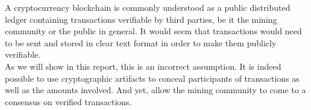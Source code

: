 

A cryptocurrency blockchain is commonly understood as a public distributed ledger containing transactions 
verifiable by third parties, be it the mining community or the public in general.
It would seem that transactions would need to be sent and stored in clear text format in order to
make them publicly verifiable.
\\

As we will show in this report, this is an incorrect assumption. It is indeed possible to use cryptographic
artifacts to conceal participants of transactions as well as the amounts involved. And yet, allow the mining
community to come to a consensus on verified transactions.





